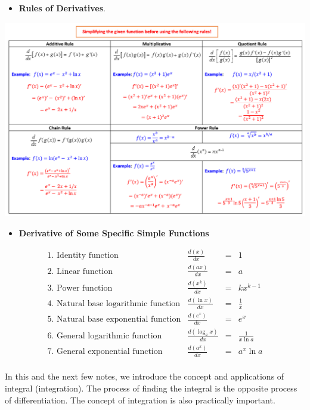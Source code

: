 \documentclass[
]{book}
\providecommand{\tightlist}{%
  \setlength{\itemsep}{0pt}\setlength{\parskip}{0pt}}
\begin{document}
\hfill\break

\begin{itemize}
\tightlist
\item
  \textbf{Rules of Derivatives}.
\end{itemize}

\begin{center}\includegraphics[width=0.99\linewidth]{img11/w11-RuleDerivatives} \end{center}

\begin{itemize}
\tightlist
\item
  \textbf{Derivative of Some Specific Simple Functions}
\end{itemize}

\[
\begin{array}{llcl}
\text{1. Identity function} & \frac{d(x)}{dx} & = & 1  \\
\text{2. Linear function} & \frac{d(ax)}{dx} & = & a  \\
\text{3. Power function} & \frac{d(x^k)}{dx} & = & kx^{k-1}  \\
\text{4. Natural base logarithmic function} & \frac{d(\ln x)}{dx} & = & \frac{1}{x}  \\
\text{5. Natural base exponential function} & \frac{d(e^x)}{dx} & = & e^x  \\
\text{6. General logarithmic function} & \frac{d(\log_a x)}{dx} & = & \frac{1}{x\ln a}  \\
\text{7. General exponential function} & \frac{d(a^x)}{dx} & = & a^x\ln a  \\
\end{array}
\]

\hfill\break

In this and the next few notes, we introduce the concept and applications of integral (integration). The process of finding the integral is the opposite process of differentiation. The concept of integration is also practically important.
\end{document}

